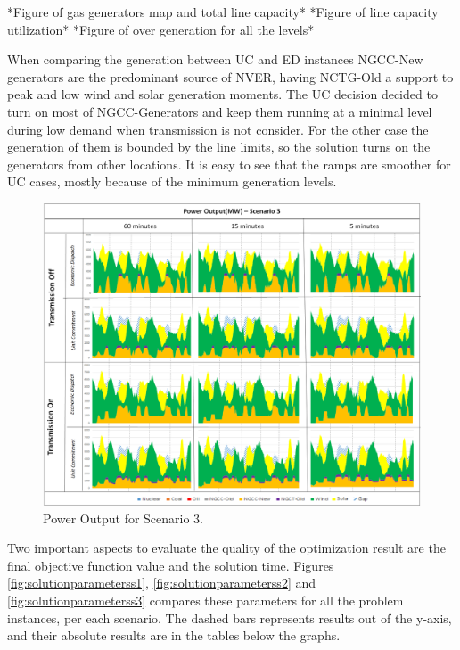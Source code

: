 \documentclass[12pt,LUDisStyle,twosided]{book}
\begin{document}
*Figure of gas generators map and total line capacity*
*Figure of line capacity utilization*
*Figure of over generation for all the levels*

When comparing the generation between UC and ED instances NGCC-New generators are the predominant source of NVER, having NCTG-Old a support to peak and low wind and solar generation moments. The UC decision decided to turn on most of NGCC-Generators and keep them running at a minimal level during low demand when transmission is not consider. For the other case the generation of them is bounded by the line limits, so the solution turns on the generators from other locations. It is easy to see that the ramps are smoother for UC cases, mostly because of the minimum generation levels.

\begin{figure} 
  \centering
  
	  \includegraphics[width=\textwidth,height=\textheight,keepaspectratio]{PowerOutputScenario3.png}
  
  \caption{Power Output for Scenario 3.}
  \label{fig:powerOutputScenario3}
\end{figure}


Two important aspects to evaluate the quality of the optimization result are the final objective function value and the solution time. Figures \ref{fig:solutionparameterss1}, \ref{fig:solutionparameterss2} and \ref{fig:solutionparameterss3} compares these parameters for all the problem instances, per each scenario. The dashed bars represents results out of the y-axis, and their absolute results are in the tables below the graphs. 
\end{document}
